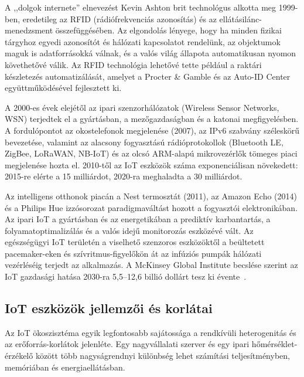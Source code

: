 A ,,dolgok internete'' elnevezést Kevin Ashton brit technológus alkotta meg 1999-ben, eredetileg
az RFID (rádiófrekvenciás azonosítás) és az ellátásilánc-menedzsment összefüggésében. Az elgondolás
lényege, hogy ha minden fizikai tárgyhoz egyedi azonosítót és hálózati kapcsolatot rendelünk, az
objektumok maguk is adatforrásokká válnak, és a valós világ állapota automatikusan nyomon
követhetővé válik. Az RFID technológia lehetővé tette például a raktári
készletezés automatizálását, amelyet a Procter \& Gamble és az Auto-ID Center együttműködésével
fejlesztett ki.

A 2000-es évek elejétől az ipari szenzorhálózatok (Wireless Sensor Networks, WSN) terjedtek el a
gyártásban, a mezőgazdaságban és a katonai megfigyelésben. A fordulópontot az okostelefonok
megjelenése (2007), az IPv6 szabvány széleskörű bevezetése, valamint az alacsony fogyasztású
rádióprotokollok (Bluetooth LE, ZigBee, LoRaWAN, NB-IoT) és az olcsó ARM-alapú mikrovezérlők
tömeges piaci megjelenése hozta el. 2010-től az IoT eszközök száma exponenciálisan növekedett:
2015-re elérte a 15 milliárdot, 2020-ra meghaladta a 30 milliárdot.

Az intelligens otthonok piacán a Nest termosztát (2011), az Amazon Echo (2014) és a Philips Hue
izzósorozat paradigmaváltást hozott a fogyasztói elektronikában. Az ipari IoT a gyártásban és az
energetikában a prediktív karbantartás, a folyamatoptimalizálás és a valós idejű monitorozás
eszközévé vált. Az egészségügyi IoT területén a viselhető szenzoros eszközöktől a beültetett
pacemaker-eken és szívritmus-figyelőkön át az infúziós pumpák hálózati vezérléséig terjedt az
alkalmazás. A McKinsey Global Institute becslése szerint az IoT gazdasági hatása 2030-ra
5,5--12,6 billió dollárt tesz ki évente~\cite{mckinsey_iot}.

\subsection{IoT eszközök jellemzői és korlátai}

Az IoT ökoszisztéma egyik legfontosabb sajátossága a rendkívüli heterogenitás és az erőforrás-korlátok
jelenléte. Egy nagyvállalati szerver és egy ipari hőmérséklet-érzékelő között több nagyságrendnyi
különbség lehet számítási teljesítményben, memóriában és energiaellátásban.

